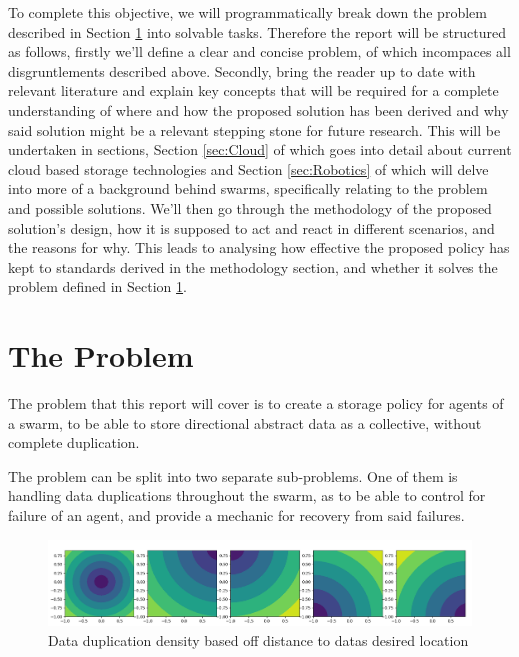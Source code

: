 \documentclass{UoYCSproject}
\begin{document}
To complete this objective, we will programmatically break down the problem described in Section \ref{sec:Problem} into solvable tasks.
Therefore the report will be structured as follows, firstly we’ll define a clear and concise problem, of which incompaces all disgruntlements described above.
Secondly, bring the reader up to date with relevant literature and explain key concepts that will be required for a complete understanding of where and how the proposed solution has been derived and why said solution might be a relevant stepping stone for future research.
This will be undertaken in sections, Section \ref{sec:Cloud} of which goes into detail about current cloud based storage technologies and Section \ref{sec:Robotics} of which will delve into more of a background behind swarms, specifically relating to the problem and possible solutions.
We’ll then go through the methodology of the proposed solution’s design, how it is supposed to act and react in different scenarios, and the reasons for why.
This leads to analysing how effective the proposed policy has kept to standards derived in the methodology section, and whether it solves the problem defined in Section \ref{sec:Problem}.


\section{The Problem}
\label{sec:Problem}

The problem that this report will cover is to create a storage policy for agents of a swarm, to be able to store directional abstract data as a collective, without complete duplication.

The problem can be split into two separate sub-problems.
One of them is handling data duplications throughout the swarm, as to be able to control for failure of an agent, and provide a mechanic for recovery from said failures.

\begin{figure}[htb]
\label{fig:popdensity}
\begin{center}
\centering
\includegraphics[width=\linewidth]{"./ExplanationImgs/Memory_Pop_Density.png"}
\caption{Data duplication density based off distance to datas desired location}
\end{center}
\end{figure}
\end{document}

